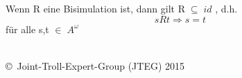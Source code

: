 \documentclass{article}
\begin{document}
	Wenn R eine Bisimulation ist, dann gilt $\mathrm{R}\;\subseteq\;id$ , d.h.
	\[
		sRt \Rightarrow s = t
	\]
	f\"ur alle s,t $\in\;A^\omega$\\\\
	\begin{tiny}
	\copyright\ Joint-Troll-Expert-Group (JTEG) 2015
	\end{tiny}
	\newpage
	
	
	
	
	
	
	
	
	
	
	
	
	
	
	
	
\end{document}

